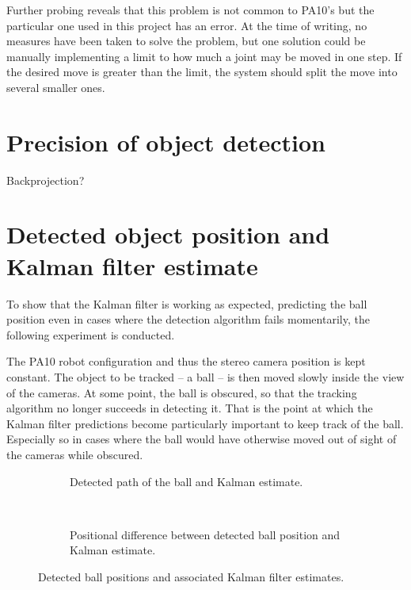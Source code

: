 Further probing reveals that this problem is not common to PA10's but the particular one used in this project has an error.
At the time of writing, no measures have been taken to solve the problem, but one solution could be manually implementing a limit to how much a joint may be moved in one step.
If the desired move is greater than the limit, the system should split the move into several smaller ones.


\section{Precision of object detection}
Backprojection?


\section{Detected object position and Kalman filter estimate}
To show that the Kalman filter is working as expected, predicting the ball position even in cases where the detection algorithm fails momentarily, the following experiment is conducted.

The PA10 robot configuration and thus the stereo camera position is kept constant.
The object to be tracked -- a ball -- is then moved slowly inside the view of the cameras.
At some point, the ball is obscured, so that the tracking algorithm no longer succeeds in detecting it.
That is the point at which the Kalman filter predictions become particularly important to keep track of the ball.
Especially so in cases where the ball would have otherwise moved out of sight of the cameras while obscured.

\begin{figure}[htb]
    \centering
    \begin{subfigure}[b]{0.49\textwidth}
        \resizebox{\columnwidth}{!}{%
            
        }
        \caption{Detected path of the ball and Kalman estimate.}
        \label{fig:ball_kalman_3d}
    \end{subfigure}~
    \begin{subfigure}[b]{0.49\textwidth}
        \resizebox{\columnwidth}{!}{%
            
        }
        \caption{Positional difference between detected ball position and Kalman estimate.}
        \label{fig:ball_kalman_error}
    \end{subfigure}
    \caption{Detected ball positions and associated Kalman filter estimates.}
    \label{fig:kalman_test}
\end{figure}

